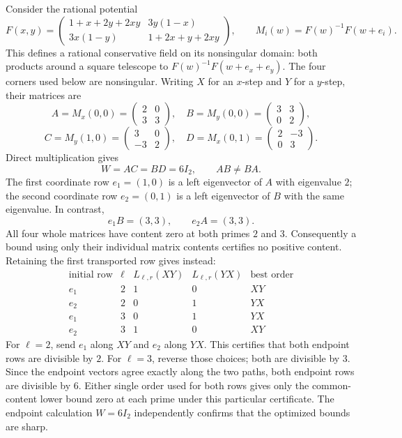 \documentclass[11pt]{article}
\begin{document}
Consider the rational potential
\[
 F(x,y)=
 \begin{pmatrix}
 1+x+2y+2xy&3y(1-x)\\
 3x(1-y)&1+2x+y+2xy
 \end{pmatrix},
 \qquad
 M_i(w)=F(w)^{-1}F(w+e_i).
\]
This defines a rational conservative field on its nonsingular domain:
both products around a square telescope to
$F(w)^{-1}F(w+e_x+e_y)$.  The four corners used below are nonsingular.
Writing $X$ for an $x$-step and $Y$ for a $y$-step, their matrices are
\[
 A=M_x(0,0)=\begin{pmatrix}2&0\\3&3\end{pmatrix},\quad
 B=M_y(0,0)=\begin{pmatrix}3&3\\0&2\end{pmatrix},
\]
\[
 C=M_y(1,0)=\begin{pmatrix}3&0\\-3&2\end{pmatrix},\quad
 D=M_x(0,1)=\begin{pmatrix}2&-3\\0&3\end{pmatrix}.
\]
Direct multiplication gives
\[
 W=AC=BD=6I_2,
 \qquad AB\ne BA.
\]
The first coordinate row $e_1=(1,0)$ is a left eigenvector of $A$ with
eigenvalue $2$; the second coordinate row $e_2=(0,1)$ is a left eigenvector
of $B$ with the same eigenvalue.  In contrast,
\[
 e_1B=(3,3),\qquad e_2A=(3,3).
\]
All four whole matrices have content zero at both primes $2$ and $3$.
Consequently a bound using only their individual matrix contents certifies
no positive content.  Retaining the first transported row gives instead:
\[
\begin{array}{c|c|cc|c}
\text{initial row}&\ell&L_{\ell,r}(XY)&L_{\ell,r}(YX)&
\text{best order}\\\hline
e_1&2&1&0&XY\\
e_2&2&0&1&YX\\
e_1&3&0&1&YX\\
e_2&3&1&0&XY
\end{array}
\]
For $\ell=2$, send $e_1$ along $XY$ and $e_2$ along $YX$.  This certifies
that both endpoint rows are divisible by $2$.  For $\ell=3$, reverse those
choices; both are divisible by $3$.  Since the endpoint vectors agree
exactly along the two paths, both endpoint rows are divisible by $6$.
Either single order used for both rows gives only the common-content lower
bound zero at each prime under this particular certificate.  The endpoint
calculation $W=6I_2$ independently confirms that the optimized bounds are
sharp.
\end{document}
